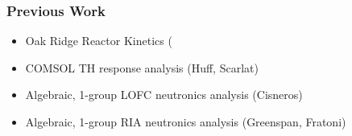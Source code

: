 \begin{frame}[fragile]
  \frametitle{Previous Work}
  \begin{itemize}
    \item Oak Ridge Reactor Kinetics (
    \item COMSOL TH response analysis (Huff, Scarlat)
    \item Algebraic, 1-group LOFC neutronics analysis (Cisneros)
    \item Algebraic, 1-group RIA neutronics analysis (Greenspan, Fratoni)
  \end{itemize}

\end{frame}
